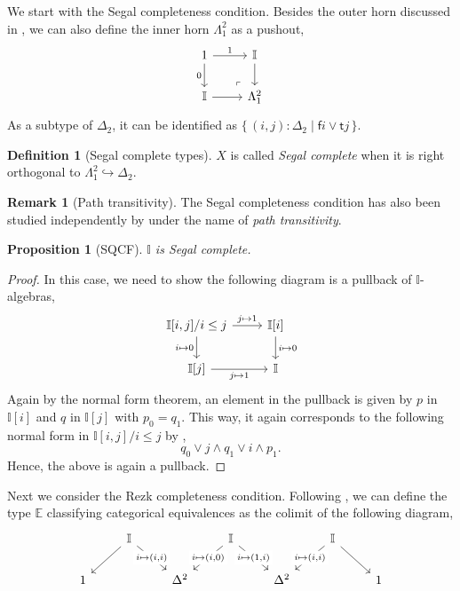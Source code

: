 \documentclass[a4paper,12pt]{amsart}
\newtheorem{proposition}[theorem]{Proposition}
\theoremstyle{definition}
\newtheorem{definition}[theorem]{Definition}
\newtheorem{remark}[theorem]{Remark}
\newcommand{\mbb}[1]{\mathbb{#1}}
\newcommand{\I}{\mbb I}
\newcommand{\ms}[1]{\mathsf{#1}}
\newcommand{\scomp}[2]{\{\,#1\mid#2\,\}}
\newcommand{\hook}{\hookrightarrow}
\begin{document}
We start with the Segal completeness condition. Besides the outer horn discussed in , we can also define the inner horn $\Lambda^2_1$ as a pushout,
\[
  \begin{tikzcd}
    1 \ar[d, "0"'] \ar[r, "1"] & \I \ar[d] \\
    \I \ar[r] & \Lambda^2_1
    \arrow["\lrcorner"{anchor=center, pos=0.125, rotate=180}, draw=none, from=2-2, to=1-1]
  \end{tikzcd}
\]
As a subtype of $\Delta_2$, it can be identified as $\scomp{(i,j) : \Delta_2}{\ms fi \vee \ms tj}$.

\begin{definition}[Segal complete types]
  $X$ is called \emph{Segal complete} when it is right orthogonal to $\Lambda^2_1 \hook \Delta_2$.
\end{definition}

\begin{remark}[Path transitivity]
  The Segal completeness condition has also been studied independently by \citet{fiore2001domains} under the name of \emph{path transitivity}.
\end{remark}

\begin{proposition}[SQCF]
  $\I$ is Segal complete.
\end{proposition}
\begin{proof}
  In this case, we need to show the following diagram is a pullback of $\I$-algebras, 
  \[
  \begin{tikzcd}
    \I[i,j]/i\le j \ar[r, "j \mapsto 1"] \ar[d, "i \mapsto 0"'] & \I[i] \ar[d, "i \mapsto 0"] \\
    \I[j] \ar[r, "j \mapsto 1"'] & \I
  \end{tikzcd}
  \]
  Again by the normal form theorem, an element in the pullback is given by $p$ in $\I[i]$ and $q$ in $\I[j]$ with $p_0 = q_1$. This way, it again corresponds to the following normal form in $\I[i,j]/i \le j$ by ,
  \[ q_0 \vee j \wedge q_1 \vee i \wedge p_1. \]
  Hence, the above is again a pullback.
\end{proof}

Next we consider the Rezk completeness condition. Following \citet{buchholtz2021synthetic}, we can define the type $\mbb E$ classifying categorical equivalences as the colimit of the following diagram,
\[
\begin{tikzcd}
	& \I && \I && \I \\
	1 && {\Delta^2} && {\Delta^2} && 1
	\arrow[from=1-2, to=2-1]
	\arrow["{i \mapsto (i,i)}"{description}, from=1-2, to=2-3]
	\arrow["{i \mapsto (i,0)}"{description}, from=1-4, to=2-3]
	\arrow["{i \mapsto (1,i)}"{description}, from=1-4, to=2-5]
	\arrow["{i \mapsto (i,i)}"{description}, from=1-6, to=2-5]
	\arrow[from=1-6, to=2-7]
\end{tikzcd}
\]
\end{document}
